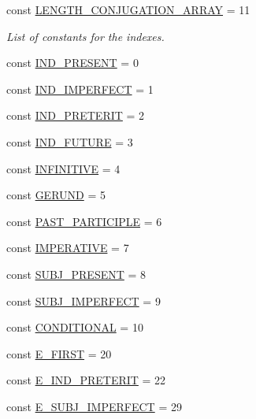 \begin{DoxyCompactItemize}
\item 
const \hyperlink{classConjugationBase_aa6a9ad231bf385e0bd9e240213facf36}{L\+E\+N\+G\+T\+H\+\_\+\+C\+O\+N\+J\+U\+G\+A\+T\+I\+O\+N\+\_\+\+A\+R\+R\+AY} = 11
\begin{DoxyCompactList}\small\item\em List of constants for the indexes. \end{DoxyCompactList}\item 
const \hyperlink{classConjugationBase_a4b8516bbdb1525fc811738abeed0e1ff}{I\+N\+D\+\_\+\+P\+R\+E\+S\+E\+NT} = 0
\item 
const \hyperlink{classConjugationBase_aff9c382a23aa5533dfed3be1f01a6b2f}{I\+N\+D\+\_\+\+I\+M\+P\+E\+R\+F\+E\+CT} = 1
\item 
const \hyperlink{classConjugationBase_a479f338d318e0c399b20e66ecd7a03ad}{I\+N\+D\+\_\+\+P\+R\+E\+T\+E\+R\+IT} = 2
\item 
const \hyperlink{classConjugationBase_ac25ac0244050e86a405bbf6fa9043a3e}{I\+N\+D\+\_\+\+F\+U\+T\+U\+RE} = 3
\item 
const \hyperlink{classConjugationBase_abfe86b2588be8dc7fc44f29a4dae0641}{I\+N\+F\+I\+N\+I\+T\+I\+VE} = 4
\item 
const \hyperlink{classConjugationBase_ace9d609af36ad729f01d6534c81caf4c}{G\+E\+R\+U\+ND} = 5
\item 
const \hyperlink{classConjugationBase_aae5feaa02f682a7e2638f2bab47e6464}{P\+A\+S\+T\+\_\+\+P\+A\+R\+T\+I\+C\+I\+P\+LE} = 6
\item 
const \hyperlink{classConjugationBase_ae4ec99d52ae2e6edd912cf67e78442bb}{I\+M\+P\+E\+R\+A\+T\+I\+VE} = 7
\item 
const \hyperlink{classConjugationBase_a143faefe023f7f45d77ad739b8611d45}{S\+U\+B\+J\+\_\+\+P\+R\+E\+S\+E\+NT} = 8
\item 
const \hyperlink{classConjugationBase_a530c57d644601e5430c7c3ffe064f705}{S\+U\+B\+J\+\_\+\+I\+M\+P\+E\+R\+F\+E\+CT} = 9
\item 
const \hyperlink{classConjugationBase_aac0359d9a8bb66ea04612b7f14d43c50}{C\+O\+N\+D\+I\+T\+I\+O\+N\+AL} = 10
\item 
const \hyperlink{classConjugationBase_ab0751622af68b3908a8c1426e42994e3}{E\+\_\+\+F\+I\+R\+ST} = 20
\item 
const \hyperlink{classConjugationBase_a5503d31ee48719d33098591810fc3f58}{E\+\_\+\+I\+N\+D\+\_\+\+P\+R\+E\+T\+E\+R\+IT} = 22
\item 
const \hyperlink{classConjugationBase_afc268d8825396ff04f01d85deaf8c33f}{E\+\_\+\+S\+U\+B\+J\+\_\+\+I\+M\+P\+E\+R\+F\+E\+CT} = 29

\end{DoxyCompactItemize}
